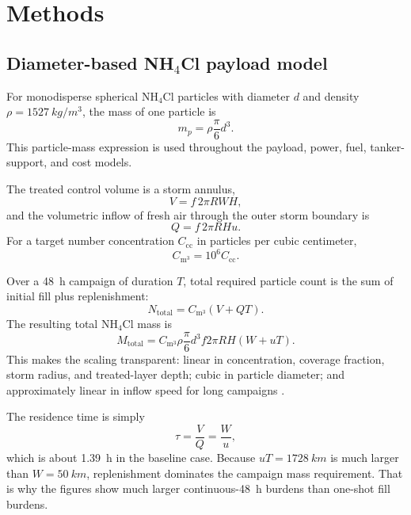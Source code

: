 \documentclass[8pt,twocolumn]{extarticle}
\begin{document}
\section*{Methods}

\subsection*{Diameter-based NH$_4$Cl payload model}

For monodisperse spherical NH$_4$Cl particles with diameter $d$ and density $\rho = \SI{1527}{kg/m^3}$, the mass of one particle is
\begin{equation}
m_p = \rho \frac{\pi}{6} d^3 .
\end{equation}
This particle-mass expression is used throughout the payload, power, fuel, tanker-support, and cost models.

\vspace{0.25em}
The treated control volume is a storm annulus,
\begin{equation}
V = f \, 2 \pi R W H ,
\end{equation}
and the volumetric inflow of fresh air through the outer storm boundary is
\begin{equation}
Q = f \, 2 \pi R H u .
\end{equation}
For a target number concentration $C_{\mathrm{cc}}$ in particles per cubic centimeter,
\begin{equation}
C_{\mathrm{m^3}} = 10^6 C_{\mathrm{cc}} .
\end{equation}

\vspace{0.25em}
Over a \SI{48}{h} campaign of duration $T$, total required particle count is the sum of initial fill plus replenishment:
\begin{equation}
N_{\mathrm{total}} = C_{\mathrm{m^3}} (V + QT) .
\end{equation}
The resulting total NH$_4$Cl mass is
\begin{equation}
M_{\mathrm{total}}
= C_{\mathrm{m^3}} \rho \frac{\pi}{6} d^3 f 2 \pi R H (W + uT) .
\end{equation}
This makes the scaling transparent: linear in concentration, coverage fraction, storm radius, and treated-layer depth; cubic in particle diameter; and approximately linear in inflow speed for long campaigns \citep{AeolusPayloadMethods}.

\vspace{0.25em}
The residence time is simply
\begin{equation}
\tau = \frac{V}{Q} = \frac{W}{u} ,
\end{equation}
which is about \SI{1.39}{h} in the baseline case. Because $uT = \SI{1728}{km}$ is much larger than $W = \SI{50}{km}$, replenishment dominates the campaign mass requirement. That is why the figures show much larger continuous-\SI{48}{h} burdens than one-shot fill burdens.
\end{document}
